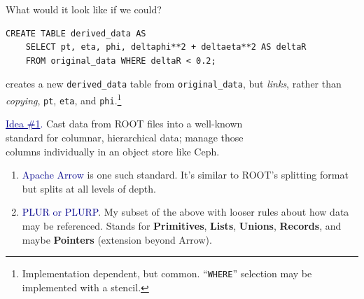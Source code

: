 \documentclass[aspectratio=169]{beamer}
\begin{document}
\begin{frame}[fragile]{What would it look like if we could?}
\begin{verbatim}
CREATE TABLE derived_data AS
    SELECT pt, eta, phi, deltaphi**2 + deltaeta**2 AS deltaR
    FROM original_data WHERE deltaR < 0.2;
\end{verbatim}

creates a new {\tt derived\_data} table from {\tt original\_data}, but {\it links}, rather than {\it copying}, {\tt pt}, {\tt eta}, and {\tt phi}.\footnote{Implementation dependent, but common. ``{\tt WHERE}'' selection may be implemented with a stencil.}

\vspace{0.25 cm}

\vspace{0.5 cm}

\vspace{0.25 cm}
\end{frame}

\begin{frame}{}
\vspace{1 cm}
\begin{center}
\Large \textcolor{darkblue}{\underline{Idea \#1}.} Cast data from ROOT files into a well-known \\ standard for columnar, hierarchical data; manage those \\ columns individually in an object store like Ceph.
\end{center}

\begin{enumerate}
\item<2-> \textcolor{darkblue}{Apache Arrow} is one such standard. It's similar to ROOT's splitting format but splits at all levels of depth.
\item<3-> \textcolor{darkblue}{PLUR or PLURP}. My subset of the above with looser rules about how data may be referenced. Stands for {\bf Primitives}, {\bf Lists}, {\bf Unions}, {\bf Records}, and maybe {\bf Pointers} (extension beyond Arrow).
\end{enumerate}

\vspace{0.25 cm}
\begin{center}
\end{center}
\end{frame}
\end{document}
